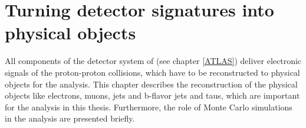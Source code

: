 \chapter{Turning detector signatures into physical objects}\label{detectorsignatures}
All components of the detector system of {\ATLAS} (see chapter \ref{ATLAS}) deliver electronic signals of the proton-proton collisions, which have to be reconstructed to physical objects for the analysis. This chapter describes the reconstruction of the physical objects like electrons, muons, jets and b-flavor jets and taus, which are important for the analysis in this thesis. Furthermore, the role of Monte Carlo simulations in the analysis are presented briefly.
